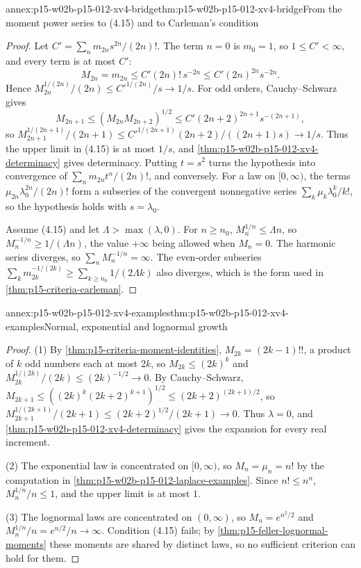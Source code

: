 \begin{annexitem}{annex:p15-w02b-p15-012-xv4-bridge}{thm:p15-w02b-p15-012-xv4-bridge}{From the moment power series to (4.15) and to Carleman's condition}
\begin{proof}
Let \(C'=\sum_nm_{2n}s^{2n}/(2n)!\). The term \(n=0\) is \(m_0=1\), so
\(1\leq C'<\infty\), and every term is at most \(C'\):
\[
 M_{2n}=m_{2n}\leq C'(2n)!\,s^{-2n}\leq C'(2n)^{2n}s^{-2n}.
\]
Hence \(M_{2n}^{1/(2n)}/(2n)\leq C'^{1/(2n)}/s\to1/s\). For odd orders,
Cauchy--Schwarz gives
\[
 M_{2n+1}\leq(M_{2n}M_{2n+2})^{1/2}\leq C'(2n+2)^{2n+1}s^{-(2n+1)},
\]
so \(M_{2n+1}^{1/(2n+1)}/(2n+1)\leq C'^{1/(2n+1)}(2n+2)/((2n+1)s)\to1/s\).
Thus the upper limit in (4.15) is at most \(1/s\), and
\cref{thm:p15-w02b-p15-012-xv4-determinacy} gives determinacy.
Putting \(t=s^2\) turns the hypothesis into convergence of
\(\sum_nm_{2n}t^n/(2n)!\), and conversely.
For a law on \([0,\infty)\), the terms \(\mu_{2n}\lambda_0^{2n}/(2n)!\) form a
subseries of the convergent nonnegative series \(\sum_k\mu_k\lambda_0^k/k!\),
so the hypothesis holds with \(s=\lambda_0\).

Assume (4.15) and let \(\Lambda>\max(\lambda,0)\). For \(n\geq n_0\),
\(M_n^{1/n}\leq\Lambda n\), so \(M_n^{-1/n}\geq1/(\Lambda n)\), the value
\(+\infty\) being allowed when \(M_n=0\). The harmonic series diverges, so
\(\sum_nM_n^{-1/n}=\infty\). The even-order subseries
\(\sum_km_{2k}^{-1/(2k)}\geq\sum_{k\geq n_0}1/(2\Lambda k)\) also diverges,
which is the form used in \cref{thm:p15-criteria-carleman}.
\end{proof}
\end{annexitem}

\begin{annexitem}{annex:p15-w02b-p15-012-xv4-examples}{thm:p15-w02b-p15-012-xv4-examples}{Normal, exponential and lognormal growth}
\begin{proof}
(1) By \cref{thm:p15-criteria-moment-identities},
\(M_{2k}=(2k-1)!!\), a product of \(k\) odd numbers each at most \(2k\), so
\(M_{2k}\leq(2k)^k\) and \(M_{2k}^{1/(2k)}/(2k)\leq(2k)^{-1/2}\to0\). By
Cauchy--Schwarz,
\(M_{2k+1}\leq((2k)^k(2k+2)^{k+1})^{1/2}\leq(2k+2)^{(2k+1)/2}\), so
\(M_{2k+1}^{1/(2k+1)}/(2k+1)\leq(2k+2)^{1/2}/(2k+1)\to0\). Thus
\(\lambda=0\), and \cref{thm:p15-w02b-p15-012-xv4-determinacy} gives the
expansion for every real increment.

(2) The exponential law is concentrated on \([0,\infty)\), so
\(M_n=\mu_n=n!\) by the computation in
\cref{thm:p15-w02b-p15-012-laplace-examples}. Since \(n!\leq n^n\),
\(M_n^{1/n}/n\leq1\), and the upper limit is at most \(1\).

(3) The lognormal laws are concentrated on \((0,\infty)\), so
\(M_n=e^{n^2/2}\) and \(M_n^{1/n}/n=e^{n/2}/n\to\infty\). Condition (4.15)
fails; by \cref{thm:p15-feller-lognormal-moments} these moments are shared by
distinct laws, so no sufficient criterion can hold for them.
\end{proof}
\end{annexitem}

